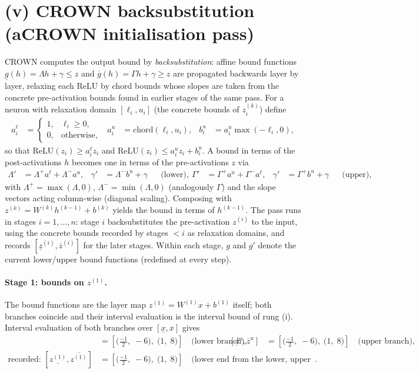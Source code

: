 \documentclass[11pt]{article}
\begin{document}
\section{(v) CROWN backsubstitution (aCROWN initialisation pass)}
CROWN computes the output bound by \emph{backsubstitution}: affine bound functions
$\underline{g}(h) = \Lambda h + \gamma \le z$ and $\overline{g}(h) = \Gamma h + \gamma \ge z$
are propagated backwards layer by layer, relaxing each ReLU by chord bounds whose slopes are taken
from the concrete pre-activation bounds found in earlier stages of the same pass. For a neuron with
relaxation domain $[\ell_i, u_i]$ (the concrete bounds of $z^{(k)}_i$) define
\begin{align*}
a^{\ell}_i &= \begin{cases} 1, & \ell_i \ge 0,\\ 0, & \text{otherwise}, \end{cases} & a^{u}_i &= \mathrm{chord}(\ell_i, u_i), & b^{u}_i &= a^{u}_i \max(-\ell_i, 0),
\end{align*}
so that $\mathrm{ReLU}(z_i) \ge a^{\ell}_i z_i$ and
$\mathrm{ReLU}(z_i) \le a^{u}_i z_i + b^{u}_i$. A bound in terms of the post-activations $h$ becomes
one in terms of the pre-activations $z$ via
\begin{align*}
\Lambda' &= \Lambda^{+} a^{\ell} + \Lambda^{-} a^{u}, & \gamma' &= \Lambda^{-} b^{u} + \gamma && \text{(lower)}, \
\Gamma' &= \Gamma^{+} a^{u} + \Gamma^{-} a^{\ell}, & \gamma' &= \Gamma^{+} b^{u} + \gamma && \text{(upper)},
\end{align*}
with $\Lambda^{+} = \max(\Lambda, 0)$, $\Lambda^{-} = \min(\Lambda, 0)$ (analogously $\Gamma$) and the
slope vectors acting column-wise (diagonal scaling). Composing with
$z^{(k)} = W^{(k)} h^{(k-1)} + b^{(k)}$ yields the bound in terms of $h^{(k-1)}$. The pass runs in
stages $i = 1, \dots, n$: stage $i$ backsubstitutes the pre-activation $z^{(i)}$ to the input, using
the concrete bounds recorded by stages $< i$ as relaxation domains, and records
$[\underline{z}^{(i)}, \overline{z}^{(i)}]$ for the later stages. Within each stage, $g$ and $g'$
denote the current lower/upper bound functions (redefined at every step).
\paragraph{Stage 1: bounds on $z^{(1)}$.}
The bound functions are the layer map $z^{(1)} = W^{(1)} x + b^{(1)}$ itself; both branches coincide and their interval evaluation is the interval bound of rung (i).
Interval evaluation of both branches over $[\underline{x}, \overline{x}]$ gives
\begin{align*}
[\underline{z}^{\ell}, \overline{z}^{\ell}] &= [\bigl(\frac{-1}{2},\; -6\bigr),\; \bigl(1,\; 8\bigr)] \quad\text{(lower branch)}, & [\underline{z}^{u}, \overline{z}^{u}] &= [\bigl(\frac{-1}{2},\; -6\bigr),\; \bigl(1,\; 8\bigr)] \quad\text{(upper branch)}, \\
\text{recorded: } [\underline{z^{(1)}}, \overline{z^{(1)}}] &= [\bigl(\frac{-1}{2},\; -6\bigr),\; \bigl(1,\; 8\bigr)] \quad\text{(lower end from the lower, upper end from the upper branch)}.
\end{align*}
\end{document}
